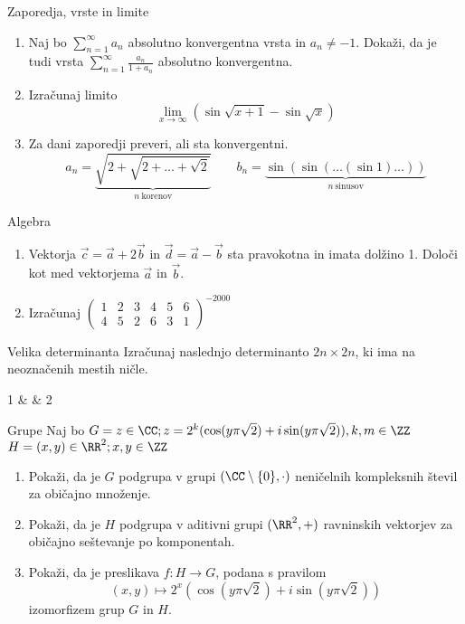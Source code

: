 \begin{frame}{Zaporedja, vrste in limite}
	\begin{enumerate}
		\item 
		Naj bo $\sum_{n=1}^{\infty}a_n$ absolutno konvergentna vrsta in $a_n \ne -1$.
		Dokaži, da je tudi vrsta $\sum_{n=1}^\infty \frac{a_n}{1+a_n}$
		absolutno konvergentna.

		\item
		Izračunaj limito
		$$
		\lim_{x \rightarrow \infty} (\sin \sqrt{x+1}-\sin\sqrt{x})
		$$
		\item
		Za dani zaporedji preveri, ali sta konvergentni.
		$$
		a_n = \underbrace{\sqrt{2+\sqrt{2+\dots+\sqrt{2}}}}_{n~\text{korenov}} \qquad
		b_n = \underbrace{\sin(\sin(\dots(\sin 1)\dots))}_{n~\text{sinusov}}
		$$
		
	\end{enumerate}
\end{frame}

\begin{frame}{Algebra}
	\begin{enumerate}
		\item
		Vektorja $\vec{c} = \vec{a} + 2 \vec{b} $ in $ \vec{d} = \vec{a} - \vec{b}$
		sta pravokotna in imata dolžino 1. Določi kot med vektorjema $\vec{a}$ in $\vec{b}$.
		\item 
		Izračunaj   
	$\begin{pmatrix}
			1 & 2 & 3 & 4 & 5 & 6 \\
			4 & 5 & 2 & 6 & 3 & 1 
	\end{pmatrix} ^{-2000}$
	\end{enumerate}
\end{frame}

\begin{frame}{Velika determinanta}
	Izračunaj naslednjo determinanto $2n \times 2n$, ki ima na neoznačenih mestih ničle.
	\begin{vmatrix}
		1 & 
		  & 2
	\end{vmatrix}
\end{frame}

\begin{frame}{Grupe}
	Naj bo
    $G = {z \in \CC; z = 2^k (\cos (y \pi \sqrt{2}) + i \sin (y \pi \sqrt{2})),k ,m \in \ZZ}$
	$H = {(x,y) \in \RR^2;x,y \in \ZZ}$
	\begin{enumerate}
		\item
			Pokaži, da je $G$ podgrupa v grupi $(\CC \setminus \{0\},\cdot)$
			neničelnih kompleksnih števil za običajno množenje.
		\item
			Pokaži, da je $H$ podgrupa v aditivni grupi $(\RR ^2,+)$
			ravninskih vektorjev za običajno seštevanje po komponentah.
		\item
			Pokaži, da je preslikava $f:H\to G$, podana s pravilom
			$$ (x,y) \mapsto 2^x(\cos(y\pi \sqrt{2})+i\sin(y\pi \sqrt{2}))$$
			izomorfizem grup $G$ in $H$.
	\end{enumerate}
\end{frame}
